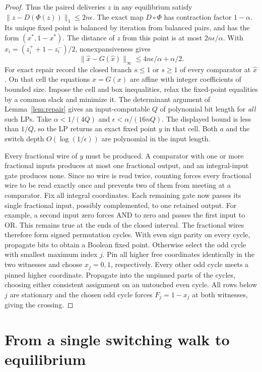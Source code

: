 \documentclass[11pt,oneside,openany,notitlepage]{report}
\begin{document}
\begin{proof}
Thus the paired deliveries \(z\) in any equilibrium satisfy
\(\|z-D(\Phi(z))\|_1\le2n\epsilon\). The exact map \(D\circ\Phi\) has
contraction factor \(1-\alpha\). Its unique fixed point is balanced
by iteration from balanced pairs, and has the form \((x^*,1-x^*)\).
The distance of \(z\) from this point is at most \(2n\epsilon/\alpha\).
With \(\hat x_i=(z_i^++1-z_i^-)/2\), nonexpansiveness gives
\[
 \|\hat x-G(\hat x)\|_\infty\le4n\epsilon/\alpha+\alpha/2 .
\]
For exact repair record the closed branch \(s\le1\) or \(s\ge1\)
of every comparator at \(\hat x\). On that cell the equations
\(x=G(x)\) are affine with integer coefficients of bounded size.
Impose the cell and box inequalities, relax the fixed-point
equalities by a common slack and minimize it. The determinant
argument of Lemma~\ref{lem:repair} gives an input-computable \(Q\)
of polynomial bit length for \emph{all} such LPs. Take
\(\alpha<1/(4Q)\) and \(\epsilon<\alpha/(16nQ)\). The displayed
bound is less than \(1/Q\), so the LP returns an exact fixed point
\(y\) in that cell. Both \(a\) and the switch depth
\(O(\log(1/\epsilon))\) are polynomial in the input length.

Every fractional wire of \(y\) must be produced. A comparator with
one or more fractional inputs produces at most one fractional output,
and an integral-input gate produces none. Since no wire is read twice,
counting forces every fractional wire to be read exactly once and
prevents two of them from meeting at a comparator. Fix all integral
coordinates. Each remaining gate now passes its single fractional
input, possibly complemented, to one retained output. For example, a
second input zero forces AND to zero and passes the first input to OR.
This remains true at the ends of the closed interval. The fractional
wires therefore form signed permutation cycles. With even sign parity
on every cycle, propagate bits to obtain a Boolean fixed point.
Otherwise select the odd cycle with smallest maximum index \(j\). Pin
all higher free coordinates identically in the two witnesses and choose
\(x_j=0,1\), respectively. Every other odd cycle meets a pinned higher
coordinate. Propagate into the unpinned parts of the cycles, choosing
either consistent assignment on an untouched even cycle. All rows
below \(j\) are stationary and the chosen odd cycle forces
\(F_j=1-x_j\) at both witnesses, giving the crossing.
\end{proof}

\chapter{From a single switching walk to equilibrium}\label{sec:arrival}
\end{document}
